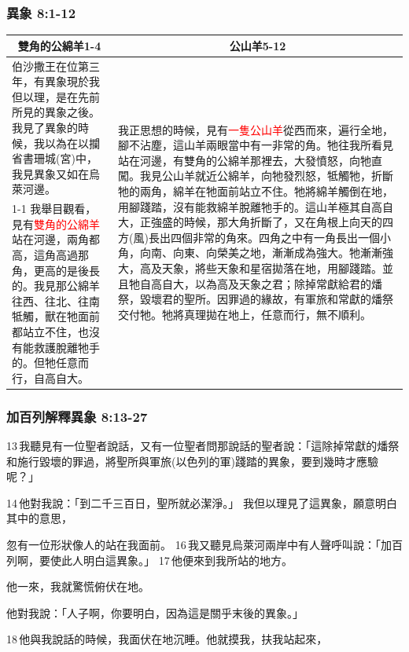 \subsubsection{異象 8:1-12}
\begin{table}[H]
\centering
\begin{tabular}{p{}|p{11.250cm}}\hline\hline
\multicolumn{1}{c|}{雙角的公綿羊1-4}&\multicolumn{1}{c}{公山羊5-12}\\\hline
伯沙撒王在位第三年，有異象現於我但以理，是在先前所見的異象之後。我見了異象的時候，我以為在以攔省書珊城(宮)中，我見異象又如在烏萊河邊。
&\multirow{2}{11.66cm}{我正思想的時候，見有\textcolor{red}{一隻公山羊}從西而來，遍行全地，腳不沾塵，這山羊兩眼當中有一非常的角。牠往我所看見站在河邊，有雙角的公綿羊那裡去，大發憤怒，向牠直闖。我見公山羊就近公綿羊，向牠發烈怒，牴觸牠，折斷牠的兩角，綿羊在牠面前站立不住。牠將綿羊觸倒在地，用腳踐踏，沒有能救綿羊脫離牠手的。這山羊極其自高自大，正強盛的時候，那大角折斷了，又在角根上向天的四方(風)長出四個非常的角來。四角之中有一角長出一個小角，向南、向東、向榮美之地，漸漸成為強大。牠漸漸強大，高及天象，將些天象和星宿拋落在地，用腳踐踏。並且牠自高自大，以為高及天象之君；除掉常獻給君的燔祭，毀壞君的聖所。因罪過的緣故，有軍旅和常獻的燔祭交付牠。牠將真理拋在地上，任意而行，無不順利。}\\\cline{1-1}
我舉目觀看，見有\textcolor{red}{雙角的公綿羊}站在河邊，兩角都高，這角高過那角，更高的是後長的。我見那公綿羊往西、往北、往南牴觸，獸在牠面前都站立不住，也沒有能救護脫離牠手的。但牠任意而行，自高自大。&\\\hline
\end{tabular}
\end{table}


\subsubsection{加百列解釋異象 8:13-27}
13 我聽見有一位聖者說話，又有一位聖者問那說話的聖者說：「這除掉常獻的燔祭和施行毀壞的罪過，將聖所與軍旅(以色列的軍)踐踏的異象，要到幾時才應驗呢？」 

14 他對我說：「到二千三百日，聖所就必潔淨。」
我但以理見了這異象，願意明白其中的意思，

忽有一位形狀像人的站在我面前。 16 我又聽見烏萊河兩岸中有人聲呼叫說：「加百列啊，要使此人明白這異象。」 17 他便來到我所站的地方。

他一來，我就驚慌俯伏在地。

他對我說：「人子啊，你要明白，因為這是關乎末後的異象。」 

18 他與我說話的時候，我面伏在地沉睡。他就摸我，扶我站起來， 

